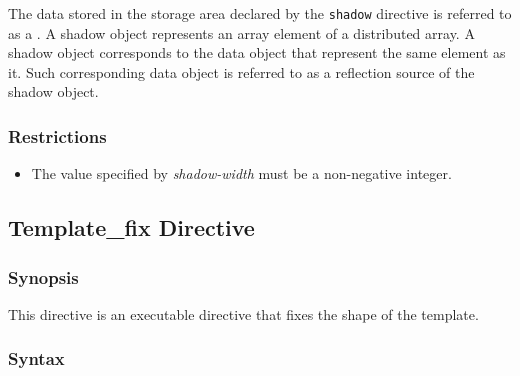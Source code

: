 The data stored in the storage area declared by the {\tt shadow}
directive is referred to as a .
%
A shadow object represents an array element of a distributed array. A
shadow object corresponds to the data object that represent the same
element as it. Such corresponding data object is referred to as a
reflection source of the shadow object.



\subsubsection*{Restrictions}

\begin{itemize}
\item The value specified by {\it shadow-width} must be a non-negative
      integer.
\end{itemize}


\subsection{Template\_fix Directive}
\label{subsec:template_fix directive}

\subsubsection*{Synopsis}
This directive is an executable directive that fixes the shape of the
template. 

\subsubsection*{Syntax}

